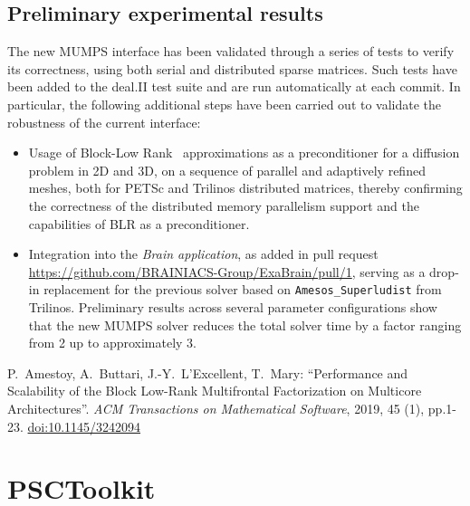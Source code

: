 \documentclass[a4paper,12pt]{article}
\begin{document}
\subsection{Preliminary experimental results}
The new MUMPS interface has been validated through a series of tests
to verify its correctness, using both serial and distributed sparse matrices. Such tests
have been added to the deal.II test suite and are run automatically at
each commit. In particular, the following additional steps have
been carried out to validate the robustness of the current interface:
\begin{itemize}
    \item Usage of Block-Low Rank~\cite{blr} approximations as a preconditioner
          for a diffusion problem in 2D and 3D, on a sequence of parallel and
          adaptively refined meshes, both for PETSc and Trilinos distributed matrices, thereby
          confirming the correctness of the distributed memory parallelism
          support and the capabilities of BLR as a preconditioner.
    \item Integration into the \emph{Brain application}, as added
          in pull request \url{https://github.com/BRAINIACS-Group/ExaBrain/pull/1}, serving as a
          drop-in replacement for the previous solver based on \texttt{Amesos\_Superludist}
          from Trilinos. Preliminary results across several
          parameter configurations show that the new MUMPS solver
          reduces the total solver time by a factor
          ranging from 2 up to approximately 3.

\end{itemize}



\begin{thebibliography}{10}
     P.~Amestoy, A.~Buttari, J.-Y.~L'Excellent,
    T.~Mary: ``Performance and Scalability of the Block Low-Rank
    Multifrontal Factorization on Multicore Architectures''. \emph{ACM
    Transactions on Mathematical Software}, 2019, 45 (1),
    pp.1-23. \href{https://doi.org/10.1145/3242094}{doi:10.1145/3242094}
\end{thebibliography}



\newpage

\section{PSCToolkit}
\label{sec:section3}
\end{document}
